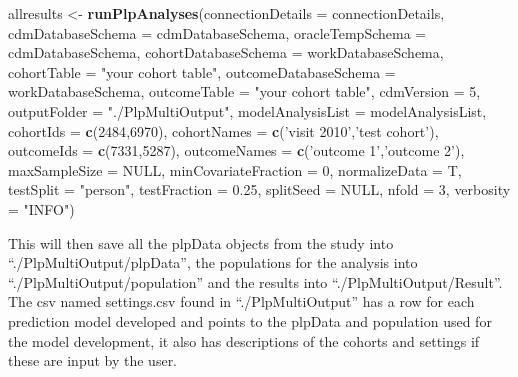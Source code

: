 \documentclass[]{article}
\newenvironment{Shaded}{\begin{snugshade}}{\end{snugshade}}
\newcommand{\KeywordTok}[1]{\textcolor[rgb]{0.13,0.29,0.53}{\textbf{#1}}}
\newcommand{\DataTypeTok}[1]{\textcolor[rgb]{0.13,0.29,0.53}{#1}}
\newcommand{\DecValTok}[1]{\textcolor[rgb]{0.00,0.00,0.81}{#1}}
\newcommand{\FloatTok}[1]{\textcolor[rgb]{0.00,0.00,0.81}{#1}}
\newcommand{\StringTok}[1]{\textcolor[rgb]{0.31,0.60,0.02}{#1}}
\newcommand{\OtherTok}[1]{\textcolor[rgb]{0.56,0.35,0.01}{#1}}
\newcommand{\NormalTok}[1]{#1}
\begin{document}
\begin{Shaded}
\begin{Highlighting}[]
\NormalTok{allresults <-}\StringTok{ }\KeywordTok{runPlpAnalyses}\NormalTok{(}\DataTypeTok{connectionDetails =}\NormalTok{ connectionDetails,}
                           \DataTypeTok{cdmDatabaseSchema =}\NormalTok{ cdmDatabaseSchema,}
                           \DataTypeTok{oracleTempSchema =}\NormalTok{ cdmDatabaseSchema,}
                           \DataTypeTok{cohortDatabaseSchema =}\NormalTok{ workDatabaseSchema,}
                           \DataTypeTok{cohortTable =} \StringTok{"your cohort table"}\NormalTok{,}
                           \DataTypeTok{outcomeDatabaseSchema =}\NormalTok{ workDatabaseSchema,}
                           \DataTypeTok{outcomeTable =} \StringTok{"your cohort table"}\NormalTok{,}
                           \DataTypeTok{cdmVersion =} \DecValTok{5}\NormalTok{,}
                           \DataTypeTok{outputFolder =} \StringTok{"./PlpMultiOutput"}\NormalTok{,}
                           \DataTypeTok{modelAnalysisList =}\NormalTok{ modelAnalysisList,}
                           \DataTypeTok{cohortIds =} \KeywordTok{c}\NormalTok{(}\DecValTok{2484}\NormalTok{,}\DecValTok{6970}\NormalTok{),}
                           \DataTypeTok{cohortNames =} \KeywordTok{c}\NormalTok{(}\StringTok{'visit 2010'}\NormalTok{,}\StringTok{'test cohort'}\NormalTok{),}
                           \DataTypeTok{outcomeIds =} \KeywordTok{c}\NormalTok{(}\DecValTok{7331}\NormalTok{,}\DecValTok{5287}\NormalTok{),}
                           \DataTypeTok{outcomeNames =}  \KeywordTok{c}\NormalTok{(}\StringTok{'outcome 1'}\NormalTok{,}\StringTok{'outcome 2'}\NormalTok{),}
                           \DataTypeTok{maxSampleSize =} \OtherTok{NULL}\NormalTok{,}
                           \DataTypeTok{minCovariateFraction =} \DecValTok{0}\NormalTok{,}
                           \DataTypeTok{normalizeData =}\NormalTok{ T,}
                           \DataTypeTok{testSplit =} \StringTok{"person"}\NormalTok{,}
                           \DataTypeTok{testFraction =} \FloatTok{0.25}\NormalTok{,}
                           \DataTypeTok{splitSeed =} \OtherTok{NULL}\NormalTok{,}
                           \DataTypeTok{nfold =} \DecValTok{3}\NormalTok{,}
                           \DataTypeTok{verbosity =} \StringTok{"INFO"}\NormalTok{)}
\end{Highlighting}
\end{Shaded}

This will then save all the plpData objects from the study into
``./PlpMultiOutput/plpData'', the populations for the analysis into
``./PlpMultiOutput/population'' and the results into
``./PlpMultiOutput/Result''. The csv named settings.csv found in
``./PlpMultiOutput'' has a row for each prediction model developed and
points to the plpData and population used for the model development, it
also has descriptions of the cohorts and settings if these are input by
the user.
\end{document}

